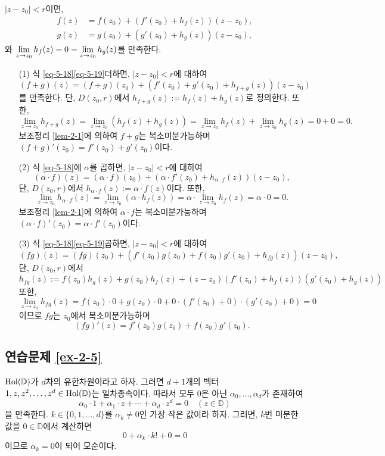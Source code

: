 $|z-z_0|<r$이면,
\begin{align}
f(z) & = f(z_0) + (f'(z_0) +h_f(z))(z-z_0), \label{eq-5-18} \\
g(z) & = g(z_0) + (g'(z_0) +h_g(z))(z-z_0), \label{eq-5-19}
\end{align}
와 $\lim\limits_{z\to z_0} h_f(z)  = 0 = \lim\limits_{z\to z_0} h_g(z)$를 만족한다.
\begin{itemize}
\item[(1)] 식 \eqref{eq-5-18}\과 \eqref{eq-5-19}\를 더하면,
$|z-z_0|<r$에 대하여
\[
(f+g)(z) = (f+g)(z_0) + \left( f'(z_0) + g'(z_0) + h_{f+g}(z) \right)(z-z_0)
\]
를 만족한다. 단, $D(z_0,r)$에서 $h_{f+g} (z) := h_f(z) + h_g(z)$로 정의한다.
또한,
\[
\lim_{z\to z_0} h_{f+g}(z) = \lim_{z\to z_0} ( h_f(z) + h_g(z) )
= \lim_{z\to z_0} h_f(z) + \lim_{z\to z_0} h_g(z) = 0+0 = 0.
\]
보조정리 \ref{lem-2-1}에 의하여
$f+g$는 복소미분가능하며 $(f+g)'(z_0) = f'(z_0) + g'(z_0)$이다.
\item[(2)] 식 \eqref{eq-5-18}에 $\alpha$를 곱하면,
$|z-z_0|<r$에 대하여
\[
(\alpha \cdot f)(z) = (\alpha \cdot f)(z_0) + \left(
\alpha\cdot f'(z_0) + h_{\alpha\cdot f}(z) \right) (z-z_0),
\]
단, $D(z_0,r)$에서 $h_{\alpha\cdot f}(z) := \alpha \cdot f(z)$이다.
또한,
\[
\lim_{z\to z_0} h_{\alpha\cdot f}(z) = \lim_{z\to z_0} (\alpha\cdot h_f(z))
= \alpha \cdot \lim_{z\to z_0} h_f(z) = \alpha\cdot 0 = 0.
\]
보조정리 \ref{lem-2-1}에 의하여
$\alpha \cdot f$는 복소미분가능하며 $(\alpha\cdot f)'(z_0) =\alpha\cdot f'(z_0)$이다.

\item[(3)] 식 \eqref{eq-5-18}\과 \eqref{eq-5-19}\를 곱하면,
$|z-z_0|<r$에 대하여
\[
(fg)(z) = (fg)(z_0) + \left( f'(z_0)g(z_0) + f(z_0)g'(z_0) + h_{fg}(z) \right) (z-z_0),
\]
단, $D(z_0,r)$에서
\[
h_{fg}(z):= f(z_0)h_g(z) + g(z_0)h_f(z) + (z-z_0)(f'(z_0)+h_f(z))(g'(z_0)+h_g(z))
\]
또한,
\[
\lim_{z\to z_0} h_{fg}(z) = f(z_0)\cdot0 + g(z_0)\cdot 0 
+ 0\cdot (f'(z_0)+0)\cdot(g'(z_0)+0)=0
\]
이므로 $fg$는 $z_0$에서 복소미분가능하며
\[
(fg)'(z) = f'(z_0)g(z_0) + f(z_0)g'(z_0).
\]
\end{itemize}

\subsection*{연습문제 \ref{ex-2-5}}

$\mathop{\mathrm{Hol}}(\mathbb D)$가 $d$차의 유한차원이라고 하자.
그러면 $d+1$개의 벡터 $1,z, z^2, \ldots, z^d\in \mathop{\mathrm{Hol}}(\mathbb  D)$는
일차종속이다. 따라서 모두 $0$은 아닌 $\alpha_0, \ldots, \alpha_d$가 존재하여
\[
\alpha_0\cdot 1 + \alpha_1\cdot z + \cdots + \alpha_d \cdot z^d = 0
\quad(z\in \mathbb D)
\]
을 만족한다.
$k\in \{0, 1, \ldots, d\}$를 $\alpha_k \ne 0$인 가장 작은 값이라 하자.
그러면, $k$번 미분한 값을 $0\in \mathbb D$에서 계산하면
\[
0 + \alpha_k \cdot k! + 0 = 0
\]
이므로 $\alpha_k=0$이 되어 모순이다.

